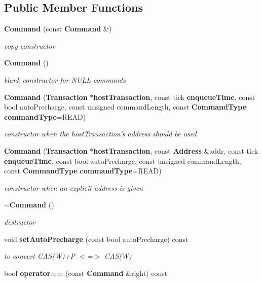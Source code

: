 \subsection*{Public Member Functions}
\begin{DoxyCompactItemize}
\item 
{\bf Command} (const {\bf Command} \&)\label{class_d_r_a_msim_i_i_1_1_command_a73edafc4b38e3c5febe1270f1c6ef0d5}

\begin{DoxyCompactList}\small\item\em copy constructor \item\end{DoxyCompactList}\item 
{\bf Command} ()\label{class_d_r_a_msim_i_i_1_1_command_a18df2d81039392daeb0b78c346a70537}

\begin{DoxyCompactList}\small\item\em blank constructor for NULL commands \item\end{DoxyCompactList}\item 
{\bf Command} ({\bf Transaction} $\ast${\bf hostTransaction}, const tick {\bf enqueueTime}, const bool autoPrecharge, const unsigned commandLength, const {\bf CommandType} {\bf commandType}=READ)\label{class_d_r_a_msim_i_i_1_1_command_a8788e1ab0eff1a17e0576e45bb0f4993}

\begin{DoxyCompactList}\small\item\em constructor when the hostTransaction's address should be used \item\end{DoxyCompactList}\item 
{\bf Command} ({\bf Transaction} $\ast${\bf hostTransaction}, const {\bf Address} \&addr, const tick {\bf enqueueTime}, const bool autoPrecharge, const unsigned commandLength, const {\bf CommandType} {\bf commandType}=READ)\label{class_d_r_a_msim_i_i_1_1_command_ab8f2039baa068748fa987ae897a9510f}

\begin{DoxyCompactList}\small\item\em constructor when an explicit address is given \item\end{DoxyCompactList}\item 
{\bf $\sim$Command} ()
\begin{DoxyCompactList}\small\item\em destructor \item\end{DoxyCompactList}\item 
void {\bf setAutoPrecharge} (const bool autoPrecharge) const 
\begin{DoxyCompactList}\small\item\em to convert CAS(W)+P $<$=$>$ CAS(W) \item\end{DoxyCompactList}\item 
bool {\bf operator==} (const {\bf Command} \&right) const \label{class_d_r_a_msim_i_i_1_1_command_a7d846b35d3cfb89c4f6f24d1806b7977}


\end{DoxyCompactItemize}
